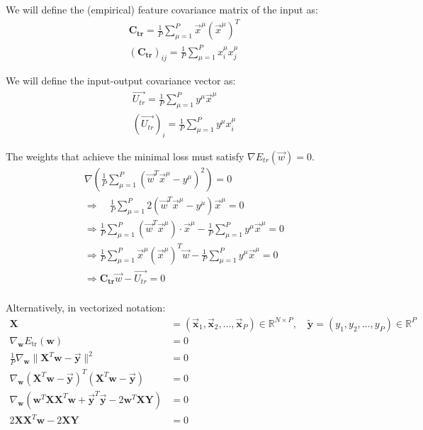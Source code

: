 \documentclass[11pt]{book} %
\begin{document}
We will define the (empirical) feature covariance matrix of the input as:
\begin{align*}
    \mathbf{C_{tr}} = \frac{1}{P} \sum_{\mu=1}^{P} \vec{x}^\mu (\vec{x}^\mu)^T \\
    (\mathbf{C_{tr}})_{ij} = \frac{1}{P} \sum_{\mu=1}^{P} x_i^\mu x_j^\mu
\end{align*}

We will define the input-output covariance vector as:
\begin{align*}
    \vec{U_{tr}} = \frac{1}{P} \sum_{\mu=1}^{P} y^\mu \vec{x}^\mu \\
    (\vec{U_{tr}})_i = \frac{1}{P} \sum_{\mu=1}^{P} y^\mu x_i^\mu
\end{align*}

The weights that achieve the minimal loss must satisfy $\nabla E_{tr}(\vec{w}) = 0$. 
\begin{align*}
    \nabla \left(\frac{1}{P} \sum_{\mu=1}^{P} (\vec{w}^T \vec{x}^\mu - y^\mu)^2\right) = 0 \quad \\
    \Rightarrow \quad \frac{1}{P} \sum_{\mu=1}^{P} 2(\vec{w}^T \vec{x}^\mu - y^\mu) \vec{x}^\mu = 0 \\ 
    \Rightarrow \frac{1}{P} \sum_{\mu=1}^{P} (\vec{w}^T \vec{x}^\mu) \cdot \vec{x}^\mu  - \frac{1}{P} \sum_{\mu=1}^{P} y^\mu \vec{x}^\mu = 0 \\
    \Rightarrow \frac{1}{P} \sum_{\mu=1}^{P} \vec{x}^\mu (\vec{x}^\mu)^T \vec{w}  - \frac{1}{P} \sum_{\mu=1}^{P} y^\mu \vec{x}^\mu = 0 \\
    \Rightarrow \mathbf{C_{tr}} \vec{w} - \vec{U_{tr}} = 0 \\
\end{align*}

Alternatively, in vectorized notation:
\begin{align*}
    \mathbf{X} &= (\vec{\mathbf{x}}_1, \vec{\mathbf{x}}_2, \ldots, \vec{\mathbf{x}}_P) \in \mathbb{R}^{N \times P}, \quad
    \tilde{\mathbf{y}} = (y_1, y_2, \ldots, y_P) \in \mathbb{R}^P \\
    \nabla_{\mathbf{w}} E_{\text{tr}} (\mathbf{w}) &= 0 \\
    \frac{1}{P} \nabla_{\mathbf{w}} \lVert \mathbf{X}^T\mathbf{w} - \vec{\mathbf{y}} \rVert^2 &= 0 \\
    \nabla_{\mathbf{w}} (\mathbf{X}^T\mathbf{w} - \vec{\mathbf{y}})^T (\mathbf{X}^T\mathbf{w} - \vec{\mathbf{y}}) &= 0 \\
    \nabla_{\mathbf{w}} (\mathbf{w}^T\mathbf{X}\mathbf{X}^T\mathbf{w} + \vec{\mathbf{y}}^T\vec{\mathbf{y}} - 2\mathbf{w}^T\mathbf{X}\mathbf{Y}) &= 0 \\
    2\mathbf{X}\mathbf{X}^T\mathbf{w} - 2\mathbf{X}\mathbf{Y} &= 0 \\
\end{align*}
\end{document}
